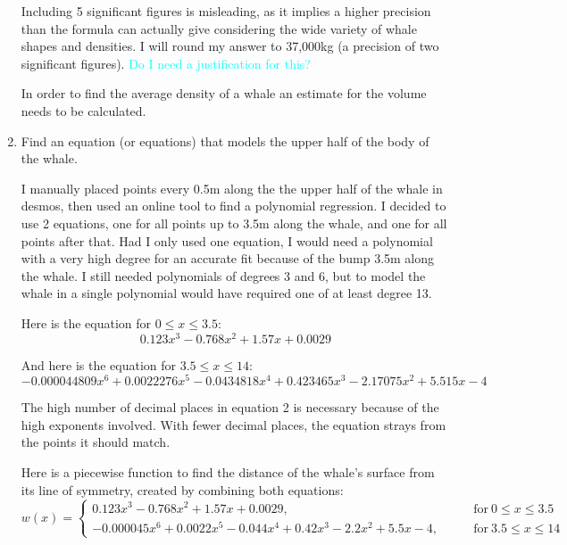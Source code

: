 \documentclass[fleqn]{article}
\newcommand\ask[1]{\textcolor{cyan}{#1}}
\begin{document}
\begin{enumerate}
  Including 5 significant figures is misleading, as it implies a higher precision than the formula can actually give considering the wide variety of whale shapes and densities. I will round my answer to 37,000kg (a precision of two significant figures). \ask{Do I need a justification for this?}

  In order to find the average density of a whale an estimate for the volume needs to be calculated.

  \item	Find an equation (or equations) that models the upper half of the body of the whale.

  I manually placed points every 0.5m along the the upper half of the whale in desmos, then used an online tool to find a polynomial regression. I decided to use 2 equations, one for all points up to 3.5m along the whale, and one for all points after that. Had I only used one equation, I would need a polynomial with a very high degree for an accurate fit because of the bump 3.5m along the whale. I still needed polynomials of degrees 3 and 6, but to model the whale in a single polynomial would have required one of at least degree 13. {\color{red}{Appendix with explanation}}

  Here is the equation for $0 \leq x \leq 3.5$:
  \begin{equation}
    0.123x^3 - 0.768x^2 + 1.57x + 0.0029
  \end{equation}

  And here is the equation for $3.5 \leq x \leq 14$:
  \begin{equation}
    -0.000044809x^6 + 0.0022276x^5 - 0.0434818x^4 + 0.423465x^3 - 2.17075x^2 + 5.515x - 4
  \end{equation}

  The high number of decimal places in equation 2 is necessary because of the high exponents involved. With fewer decimal places, the equation strays from the points it should match.

  Here is a piecewise function to find the distance of the whale's surface from its line of symmetry, created by combining both equations:
  \[
  w(x)=
  \begin{cases}
    0.123x^3 - 0.768x^2 + 1.57x + 0.0029, & \qquad \text{for} \  0 \leq x \leq 3.5 \\
    -0.000045x^6 + 0.0022x^5 - 0.044x^4 + 0.42x^3 - 2.2x^2 + 5.5x - 4, & \qquad \text{for} \  3.5 \leq x \leq 14
  \end{cases}
  \]


\end{enumerate}
\end{document}
